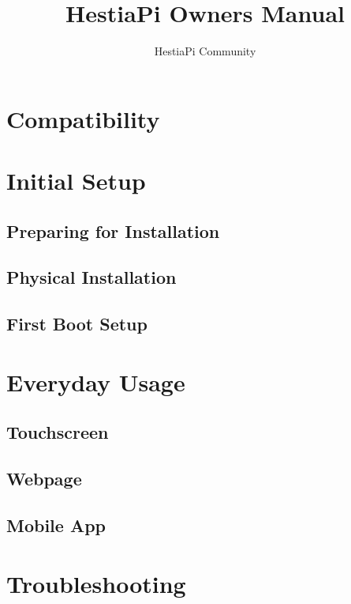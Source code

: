 \documentclass{article}
\begin{document}
\title{HestiaPi Owners Manual}
\author{HestiaPi Community}
\maketitle

\tableofcontents
\newpage

\section{Compatibility}


\section{Initial Setup}
\subsection{Preparing for Installation}

\subsection{Physical Installation} \label{Wall Installation ONE}

\subsection{First Boot Setup}


\section{Everyday Usage}
\subsection{Touchscreen} \label{Touchscreen}

\subsection{Webpage} \label{Webpage}

\subsection{Mobile App} \label{Mobile App}


\section{Troubleshooting}

\end{document}
